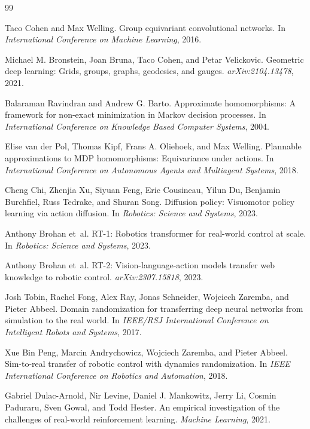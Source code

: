 \documentclass{article}
\begin{document}
\begin{thebibliography}{99}

Taco Cohen and Max Welling.
\newblock Group equivariant convolutional networks.
\newblock In \emph{International Conference on Machine Learning}, 2016.

Michael M. Bronstein, Joan Bruna, Taco Cohen, and Petar Velickovic.
\newblock Geometric deep learning: Grids, groups, graphs, geodesics, and gauges.
\newblock \emph{arXiv:2104.13478}, 2021.

Balaraman Ravindran and Andrew G. Barto.
\newblock Approximate homomorphisms: A framework for non-exact minimization in Markov decision processes.
\newblock In \emph{International Conference on Knowledge Based Computer Systems}, 2004.

Elise van der Pol, Thomas Kipf, Frans A. Oliehoek, and Max Welling.
\newblock Plannable approximations to MDP homomorphisms: Equivariance under actions.
\newblock In \emph{International Conference on Autonomous Agents and Multiagent Systems}, 2018.

Cheng Chi, Zhenjia Xu, Siyuan Feng, Eric Cousineau, Yilun Du, Benjamin Burchfiel, Russ Tedrake, and Shuran Song.
\newblock Diffusion policy: Visuomotor policy learning via action diffusion.
\newblock In \emph{Robotics: Science and Systems}, 2023.

Anthony Brohan et~al.
\newblock RT-1: Robotics transformer for real-world control at scale.
\newblock In \emph{Robotics: Science and Systems}, 2023.

Anthony Brohan et~al.
\newblock RT-2: Vision-language-action models transfer web knowledge to robotic control.
\newblock \emph{arXiv:2307.15818}, 2023.

Josh Tobin, Rachel Fong, Alex Ray, Jonas Schneider, Wojciech Zaremba, and Pieter Abbeel.
\newblock Domain randomization for transferring deep neural networks from simulation to the real world.
\newblock In \emph{IEEE/RSJ International Conference on Intelligent Robots and Systems}, 2017.

Xue Bin Peng, Marcin Andrychowicz, Wojciech Zaremba, and Pieter Abbeel.
\newblock Sim-to-real transfer of robotic control with dynamics randomization.
\newblock In \emph{IEEE International Conference on Robotics and Automation}, 2018.

Gabriel Dulac-Arnold, Nir Levine, Daniel J. Mankowitz, Jerry Li, Cosmin Paduraru, Sven Gowal, and Todd Hester.
\newblock An empirical investigation of the challenges of real-world reinforcement learning.
\newblock \emph{Machine Learning}, 2021.

\end{thebibliography}
\end{document}
